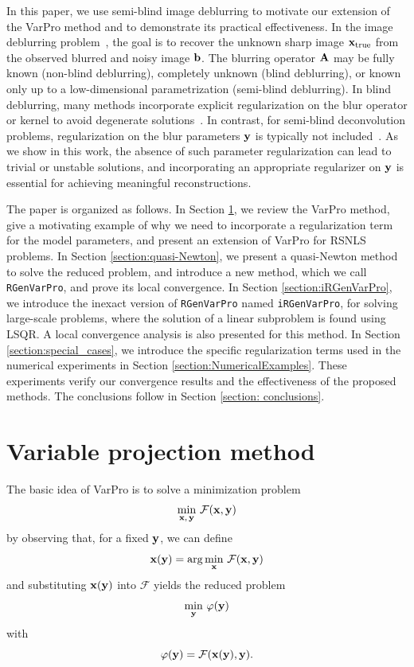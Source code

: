 \documentclass[onefignum,onetabnum]{siamart171218}
\newcommand{\bA}{{\bf A}}
\newcommand{\bb}{{\bf b}}
\newcommand{\bx}{{\bf x}}
\newcommand{\by}{{\bf y}}
\newcommand{\calF}{\mathcal{F}}
\begin{document}
In this paper, we use semi-blind image deblurring to motivate our extension of the VarPro method and to demonstrate its practical effectiveness. In the image deblurring problem~\cite{austin2022image, espanol2009multilevel, deblurring}, the goal is to recover the unknown sharp image $\bx_{\rm true}$ from the observed blurred and noisy image $\bb$. The blurring operator $\bA$ may be fully known (non-blind deblurring), completely unknown (blind deblurring), or known only up to a low-dimensional parametrization (semi-blind deblurring). In blind deblurring, many methods incorporate explicit regularization on the blur operator or kernel to avoid degenerate solutions~\cite{chan1998total, dykes2021lanczos, levin2009understanding}. In contrast, for semi-blind deconvolution problems, regularization on the blur parameters $\by$ is typically not included~\cite{buccini2018semiblind, chung2010efficient, cornelio2014constrained, espanol2025local, Espanol_2023, gazzola2021regularization}. As we show in this work, the absence of such parameter regularization can lead to trivial or unstable solutions, and incorporating an appropriate regularizer on $\by$ is essential for achieving meaningful reconstructions.

The paper is organized as follows. In Section \ref{sec:varpro}, we review the VarPro method, give a motivating example of why we need to incorporate a regularization term for the model parameters, and present an extension of VarPro for RSNLS problems. In Section \ref{section:quasi-Newton}, we present a quasi-Newton method to solve the reduced problem, and introduce a new method, which we call \texttt{RGenVarPro}, and prove its local convergence. In Section \ref{section:iRGenVarPro}, we introduce the inexact version of \texttt{RGenVarPro} named \texttt{iRGenVarPro}, for solving large-scale problems, where the solution of a linear subproblem is found using LSQR. A local convergence analysis is also presented for this method. In Section \ref{section:special_cases}, we introduce the specific regularization terms used in the numerical experiments in Section \ref{section:NumericalExamples}. These experiments verify our convergence results and the effectiveness of the proposed methods. The conclusions follow in %
Section \ref{section: conclusions}.

\section{Variable projection method}\label{sec:varpro}
The %
basic idea of VarPro is to solve a minimization problem  
$$\min_{\bx,\,\by}\,\calF(\bx,\by)$$
by observing that, for a fixed \(\by\), we can define
$$\bx(\by) = \arg\min_{\bx}\,\calF(\bx, \by)$$
and substituting $\bx(\by)$ into $\calF$ yields the reduced problem  
\begin{equation}\label{eq: minvarphi}
\min_{\by}\,\varphi(\by)
\end{equation}
 with $$\varphi(\by) = \calF(\bx(\by), \by).$$
 
\end{document}
